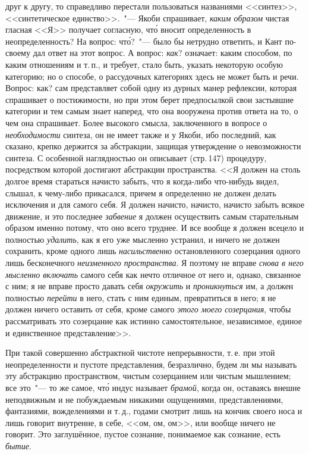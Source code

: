 друг к другу, то справедливо перестали пользоваться названиями
<<синтез>>, <<синтетическое единство>>.~"--- Якоби
спрашивает, \emph{каким образом} чистая гласная <<Я>> получает
согласную, чт\'о вносит определенность в неопределенность?
На вопрос: чт\'о?~"--- было бы нетрудно ответить, и
Кант по-своему дал ответ на этот вопрос. А вопрос: \emph{как}?
означает: каким способом, по каким отношениям и т.\,п.,
и требует, стало быть, указать некоторую особую категорию;
но о способе, о рассудочных категориях здесь не может
быть и речи. Вопрос: как? сам представляет собой
одну из дурных манер рефлексии, которая спрашивает о
постижимости, но при этом берет предпосылкой свои застывшие
категории и тем самым знает наперед, что она
вооружена против ответа на то, о чем она спрашивает.
Более высокого смысла, заключенного в вопросе о \emph{необходимости}
синтеза, он не имеет также и у Якоби, ибо
последний, как сказано, крепко держится за абстракции,
защищая утверждение о невозможности синтеза. С особенной
наглядностью он описывает (стр.\,147) процедуру,
посредством которой достигают абстракции пространства.
<<Я должен на столь долгое время стараться начисто забыть,
что я когда-либо что-нибудь видел, слышал, к чему-либо
прикасался, причем я определенно не должен
делать исключения и для самого себя. Я должен начисто,
начисто, начисто забыть всякое движение, и это последнее
\emph{забвение} я должен осуществить самым старательным образом
именно потому, что оно всего труднее. И все вообще
я должен всецело и полностью \emph{удалить}, как я его уже
мысленно устранил, и ничего не должен сохранить, кроме
одного лишь \emph{насильственно} остановленного созерцания
одного лишь бесконечного \emph{неизменного пространства}.
Я поэтому не вправе \emph{снова в него мысленно включать} самого
себя как нечто отличное от него и, однако, связанное
с ним; я не вправе просто давать себя \emph{окружить} и
\emph{проникнуться} им, а должен полностью \emph{перейти} в него,
стать с ним единым, превратиться в него; я не должен
ничего оставить от себя, кроме самого \emph{этого моего созерцания},
чтобы рассматривать это созерцание как истинно
самостоятельное, независимое, единое и единственное
представление>>.

При такой совершенно абстрактной чистоте непрерывности,
т.\,е. при этой неопределенности и пустоте представления,
безразлично, будем ли мы называть эту абстракцию
пространством, чистым созерцанием или чистым
мышлением; все это~"--- то же самое, чт\'о индус называет
\emph{брамой}, когда он, оставаясь внешне неподвижным и не
побуждаемым никакими ощущениями, представлениями,
фантазиями, вожделениями и т.\,д., годами смотрит лишь
на кончик своего носа и лишь говорит внутренне, в себе,
<<ом, ом, ом>>, или вообще ничего не говорит. Это заглушённое,
пустое сознание, понимаемое как сознание, есть
\emph{бытие}.

